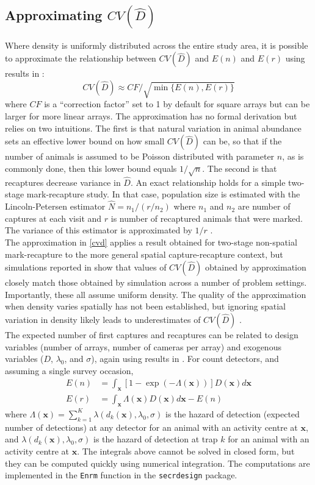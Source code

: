 \documentclass[a4paper,11pt]{article} %
\begin{document}
\subsection{Approximating $CV(\hat{D})$} \label{s:cvapprox}
Where density is uniformly distributed across the entire study area, it is possible to approximate the relationship between $CV(\hat{D})$ and $E(n)$ and $E(r)$ using results in \cite{Efford2019}: 
\begin{equation} \label{cvd}
CV(\hat{D}) \approx CF/\sqrt{\min\{E(n),E(r)\}}
\end{equation} where $CF$ is a ``correction factor'' set to 1 by default for square arrays but can be larger for more linear arrays. The approximation has no formal derivation but relies on two intuitions. The first is that natural variation in animal abundance sets an effective lower bound on how small $CV(\hat{D})$ can be, so that if the number of animals is assumed to be Poisson distributed with parameter $n$, as is commonly done, then this lower bound equals $1/\sqrt{n}$. The second is that recaptures decrease variance in $\hat{D}$. An exact relationship holds for a simple two-stage mark-recapture study. In that case, population size is estimated with the Lincoln-Petersen estimator $\hat{N}=n_1/(r/n_2)$ where $n_1$ and $n_2$ are number of captures at each visit and $r$ is number of recaptured animals that were marked. The variance of this estimator is approximated by $1/r$ \citep{Seber1982}. 
\\[1em]
The approximation in \eqref{cvd} applies a result obtained for two-stage non-spatial mark-recapture to the more general spatial capture-recapture context, but simulations reported in \cite{Efford2019} show that values of $CV(\hat{D})$ obtained by approximation closely match those obtained by simulation across a number of problem settings. Importantly, these all assume uniform density. The quality of the approximation when density varies spatially has not been established, but ignoring spatial variation in density likely leads to underestimates of $CV(\hat{D})$ \citep{Efford2019}.
\\[1em]
The expected number of first captures and recaptures can be related to design variables (number of arrays, number of cameras per array) and exogenous variables ($D$, $\lambda_0$, and $\sigma$), again using results in \cite{Efford2019}. For count detectors, and assuming a single survey occasion,
\begin{align}
E(n) &= \int_{\mathbf x} [1-\exp(-\Lambda(\mathbf x))] D(\mathbf x) d\mathbf{x} \\
E(r) &= \int_{\mathbf x} \Lambda(\mathbf x) D(\mathbf x) d\mathbf{x} - E(n)
\end{align}
where $\Lambda(\mathbf{x})=\sum_{k=1}^K \lambda(d_k(\mathbf{x}),\lambda_0,\sigma)$ is the hazard of detection (expected number of detections) at any detector for an animal with an activity centre at $\mathbf{x}$, and $\lambda(d_k(\mathbf{x}),\lambda_0,\sigma)$ is the hazard of detection at trap $k$ for an animal with an activity centre at $\mathbf{x}$. The integrals above cannot be solved in closed form, but they can be computed quickly using numerical integration. The computations are implemented in the \texttt{Enrm} function in the \texttt{secrdesign} package.
\end{document}
